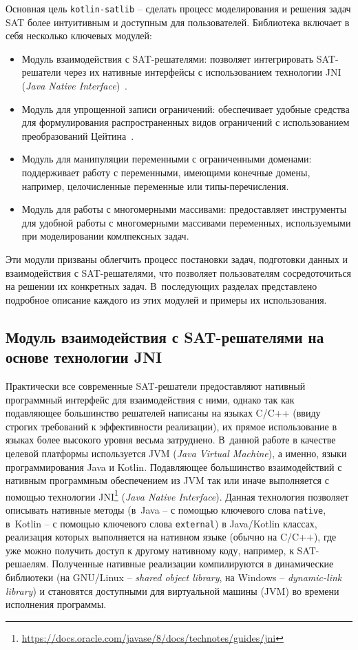 Основная цель \texttt{kotlin-satlib} \--- сделать процесс моделирования и решения задач SAT более интуитивным и доступным для пользователей.
Библиотека включает в себя несколько ключевых модулей:
\begin{itemize}
    \item Модуль взаимодействия с SAT-решателями: позволяет интегрировать SAT-решатели через их нативные интерфейсы с использованием технологии JNI (\textit{Java Native Interface})~\cite{jni}.
    \item Модуль для упрощенной записи ограничений: обеспечивает удобные средства для формулирования распространенных видов ограничений с использованием преобразований Цейтина~\cite{tseitin1970}.
    \item Модуль для манипуляции переменными с ограниченными доменами: поддерживает работу с переменными, имеющими конечные домены, например, целочисленные переменные или типы-перечисления.
    \item Модуль для работы с многомерными массивами: предоставляет инструменты для удобной работы с многомерными массивами переменных, используемыми при моделировании комлпексных задач.
\end{itemize}
Эти модули призваны облегчить процесс постановки задач, подготовки данных и взаимодействия с SAT-решателями, что позволяет пользователям сосредоточиться на решении их конкретных задач.
В~последующих разделах представлено подробное описание каждого из этих модулей и примеры их использования.

\subsection{Модуль взаимодействия с SAT-решателями на основе технологии JNI}

Практически все современные SAT-решатели предоставляют нативный программный интерфейс для взаимодействия с ними, однако так как подавляющее большинство решателей написаны на языках C/C++ (ввиду строгих требований к эффективности реализации), их прямое использование в языках более высокого уровня весьма затруднено.
В~данной работе в качестве целевой платформы используется JVM (\textit{Java Virtual Machine}), а именно, языки программирования Java и Kotlin.
Подавляющее большинство взаимодействий с нативным программным обеспечением из JVM так или иначе выполняется с помощью технологии JNI\footnote{\href{https://docs.oracle.com/javase/8/docs/technotes/guides/jni/}{https://docs.oracle.com/javase/8/docs/technotes/guides/jni}} (\textit{Java Native Interface}).
Данная технология позволяет описывать нативные методы (в~Java \--- с помощью ключевого слова \texttt{native}, в~Kotlin \--- с помощью ключевого слова \texttt{external}) в Java/Kotlin классах, реализация которых выполняется на нативном языке (обычно на C/C++), где уже можно получить доступ к другому нативному коду, например, к SAT-решаелям.
Полученные нативные реализации компилируются в динамические библиотеки (на GNU/Linux \--- \textit{shared object library}, на Windows \--- \textit{dynamic-link library}) и становятся доступными для виртуальной машины (JVM) во времени исполнения программы.

